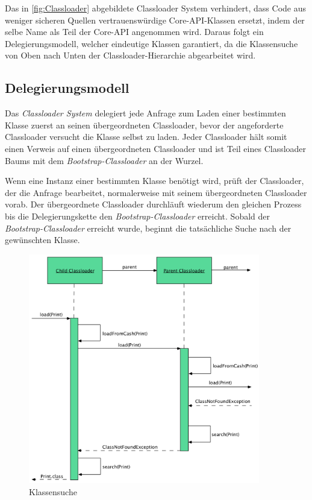     Das in \ref{fig:Classloader} abgebildete Classloader System verhindert, dass Code aus weniger sicheren Quellen vertrauenswürdige Core-API-Klassen ersetzt, indem der selbe Name als Teil der Core-API angenommen wird. Daraus folgt ein Delegierungsmodell, welcher eindeutige Klassen garantiert, da die Klassensuche von Oben nach Unten der Classloader-Hierarchie abgearbeitet wird. 
    
  \subsection{Delegierungsmodell}
    Das \textit{Classloader System} delegiert jede Anfrage zum Laden einer bestimmten Klasse zuerst an seinen übergeordneten Classloader, bevor der angeforderte Classloader versucht die Klasse selbst zu laden. Jeder Classloader hält somit einen Verweis auf einen übergeordneten Classloader und ist Teil eines Classloader Baums mit dem \textit{Bootstrap-Classloader} an der Wurzel. 

    Wenn eine Instanz einer bestimmten Klasse benötigt wird, prüft der Classloader, der die Anfrage bearbeitet, normalerweise mit seinem übergeordneten Classloader vorab. Der übergeordnete Classloader durchläuft wiederum den gleichen Prozess bis die Delegierungskette den \textit{Bootstrap-Classloader} erreicht. Sobald der \textit{Bootstrap-Classloader} erreicht wurde, beginnt die tatsächliche Suche nach der gewünschten Klasse.
    \begin{figure}[h]
      \centering
      \includegraphics[width=0.9\textwidth]{material/images/deligation.png}
      \caption{Klassensuche}
      \label{fig:deligation}
    \end{figure}

